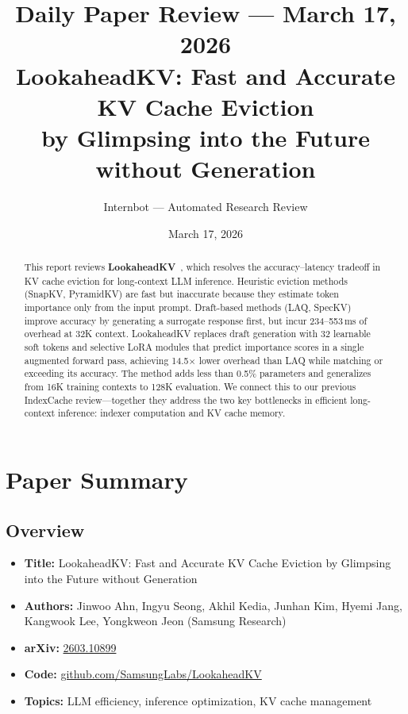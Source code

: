 \documentclass[11pt]{article}
\title{Daily Paper Review --- March 17, 2026\\
\large LookaheadKV: Fast and Accurate KV Cache Eviction\\by Glimpsing into the Future without Generation}
\author{Internbot --- Automated Research Review}
\date{March 17, 2026}
\begin{document}
\maketitle

\begin{abstract}
This report reviews \textbf{LookaheadKV}~\cite{lookaheadkv}, which resolves the accuracy--latency tradeoff in KV cache eviction for long-context LLM inference.
Heuristic eviction methods (SnapKV, PyramidKV) are fast but inaccurate because they estimate token importance only from the input prompt.
Draft-based methods (LAQ, SpecKV) improve accuracy by generating a surrogate response first, but incur 234--553\,ms of overhead at 32K context.
LookaheadKV replaces draft generation with 32 learnable soft tokens and selective LoRA modules that predict importance scores in a single augmented forward pass, achieving 14.5$\times$ lower overhead than LAQ while matching or exceeding its accuracy.
The method adds less than 0.5\% parameters and generalizes from 16K training contexts to 128K evaluation.
We connect this to our previous IndexCache review---together they address the two key bottlenecks in efficient long-context inference: indexer computation and KV cache memory.
\end{abstract}

\section{Paper Summary}

\subsection{Overview}
\begin{itemize}
    \item \textbf{Title:} LookaheadKV: Fast and Accurate KV Cache Eviction by Glimpsing into the Future without Generation
    \item \textbf{Authors:} Jinwoo Ahn, Ingyu Seong, Akhil Kedia, Junhan Kim, Hyemi Jang, Kangwook Lee, Yongkweon Jeon (Samsung Research)
    \item \textbf{arXiv:} \href{https://arxiv.org/abs/2603.10899}{2603.10899}
    \item \textbf{Code:} \href{https://github.com/SamsungLabs/LookaheadKV}{github.com/SamsungLabs/LookaheadKV}
    \item \textbf{Topics:} LLM efficiency, inference optimization, KV cache management
\end{itemize}
\end{document}

